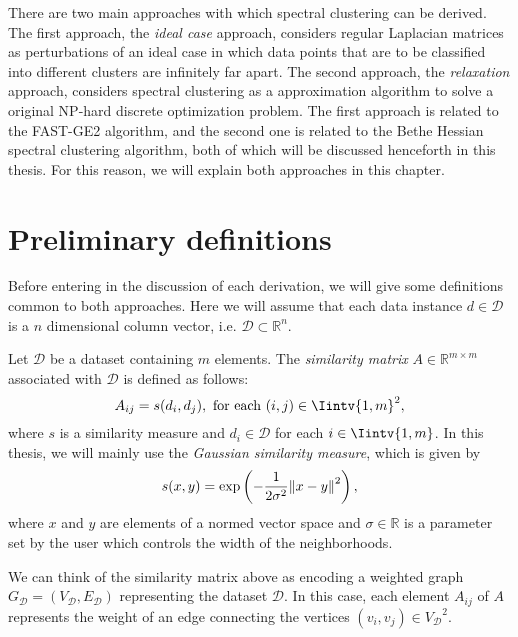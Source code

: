 There are two main approaches with which spectral clustering can be derived.
The first approach, the \textit{ideal case} approach, considers regular Laplacian matrices as perturbations of an ideal case in which data points that are to be classified into different clusters are infinitely far apart.
The second approach, the \textit{relaxation} approach, considers spectral clustering as a approximation algorithm to solve a original NP-hard discrete optimization problem.
The first approach is related to the FAST-GE2 algorithm, and the second one is related to the Bethe Hessian spectral clustering algorithm, both of which will be discussed henceforth in this thesis.
For this reason, we will explain both approaches in this chapter.

\section{Preliminary definitions}
Before entering in the discussion of each derivation, we will give some definitions common to both approaches.
Here we will assume that each data instance $d \in \mathcal D$ is a $n$ dimensional column vector, i.e. $\mathcal D \subset \mathbb R^n$.

\begin{definition}
   Let $\mathcal D$ be a dataset containing $m$ elements. The \textit{similarity matrix} $A \in \mathbb{R}^{m \times m}$ associated with $\mathcal D$ is defined as follows: 
   \begin{equation}
      A_{ij} = s(d_i,d_j), \text{ for each } (i,j) \in \Iintv{1,m}^2,
   \end{equation}
   where $s$ is a similarity measure and $d_i \in \mathcal D$ for each $i \in \Iintv{1,m}$.
   In this thesis, we will mainly use the \textit{Gaussian similarity measure}, which is given by 
   \begin{equation}
      s(x, y) = \exp \left( -\frac{1}{2 \sigma ^2} {\left\lVert x - y\right\rVert}^2 \right),
   \end{equation}
   where $x$ and $y$ are elements of a normed vector space and $\sigma \in \mathbb R$ is a parameter set by the user which controls the width of the neighborhoods.
\end{definition}

We can think of the similarity matrix above as encoding a weighted graph $G_{\mathcal D} = (V_{\mathcal D}, E_{\mathcal D})$ representing the dataset $\mathcal D$. 
In this case, each element $A_{ij}$ of $A$ represents the weight of an edge connecting the vertices $(v_i, v_j) \in {V_{\mathcal D}}^2$.

